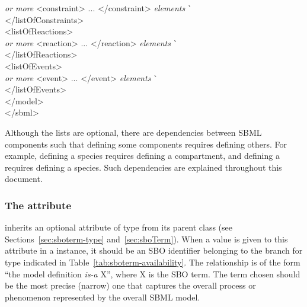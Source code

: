\begin{tt}
\begin{tabbing}
\>\>\>\textrm{\emph{ or more}} <constraint> ... </constraint> \textrm{\emph{elements}}  \` \sayOptional\\
\>\></listOfConstraints>\\
\>\><listOfReactions>\\
\>\>\>\textrm{\emph{ or more}} <reaction> ... </reaction> \textrm{\emph{elements}}  \` \sayOptional\\
\>\></listOfReactions>\\
\>\><listOfEvents>\\
\>\>\>\textrm{\emph{ or more}} <event> ... </event> \textrm{\emph{elements}}  \` \sayOptional\\
\>\></listOfEvents>\\
\></model>\\
</sbml>
\end{tabbing}
\regularspacing
\end{tt}
\vspace*{0.5ex}

Although the lists are optional, there are dependencies between
SBML components such that defining some components requires
defining others.  For example, defining a species requires
defining a compartment, and defining a  requires defining
a species.  Such dependencies are explained throughout this
document.
  




\subsubsection{The  attribute}
\label{sec:model-sboterm}

\Model inherits an optional  attribute of type
 from its parent class \SBase (see
Sections~\ref{sec:sboterm-type} and~\ref{sec:sboTerm}).  When a
value is given to this attribute in a \Model instance, it should
be an SBO identifier belonging to the branch for type \Model
indicated in Table~\ref{tab:sboterm-availability}.  The
  relationship is of the form ``the model definition \emph{is-a}
  X'', where X is the SBO term.  The term chosen should be the
most precise (narrow) one that captures the overall process or
phenomenon represented by the overall SBML model.

